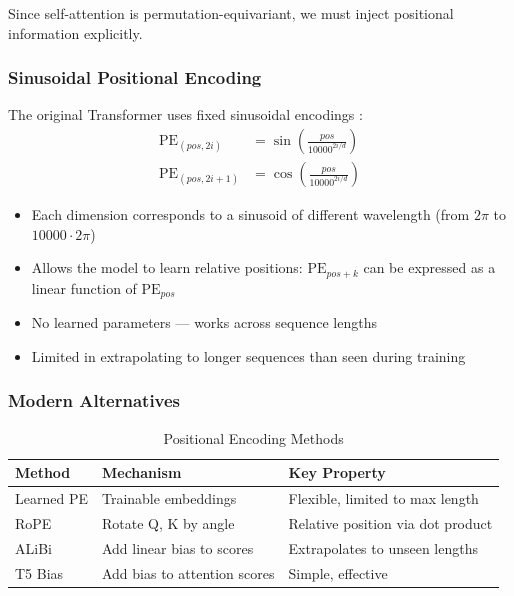 Since self-attention is permutation-equivariant, we must inject positional information explicitly.

\subsubsection{Sinusoidal Positional Encoding}

The original Transformer uses fixed sinusoidal encodings \cite{vaswani2017attention}:
\begin{align}
\text{PE}_{(pos, 2i)} &= \sin\left(\frac{pos}{10000^{2i/d}}\right) \\
\text{PE}_{(pos, 2i+1)} &= \cos\left(\frac{pos}{10000^{2i/d}}\right)
\end{align}

\begin{properties}
\begin{itemize}
    \item Each dimension corresponds to a sinusoid of different wavelength (from $2\pi$ to $10000 \cdot 2\pi$)
    \item Allows the model to learn relative positions: $\text{PE}_{pos+k}$ can be expressed as a linear function of $\text{PE}_{pos}$
    \item No learned parameters --- works across sequence lengths
    \item Limited in extrapolating to longer sequences than seen during training
\end{itemize}
\end{properties}

\subsubsection{Modern Alternatives}

\begin{table}[ht]
    \centering
    \caption{Positional Encoding Methods}
    \begin{tabular}{L{2.5cm} L{4cm} L{4.5cm}}
        \toprule
        \textbf{Method} & \textbf{Mechanism} & \textbf{Key Property} \\
        \midrule
        Learned PE & Trainable embeddings & Flexible, limited to max length \\
        RoPE & Rotate Q, K by angle & Relative position via dot product \\
        ALiBi & Add linear bias to scores & Extrapolates to unseen lengths \\
        T5 Bias & Add bias to attention scores & Simple, effective \\
        \bottomrule
    \end{tabular}
\end{table}

